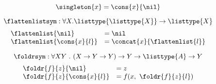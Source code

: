 \begin{definition}
  \[ \singleton{x} = \cons{x}{\nil} \]
\end{definition}

\begin{definition}
  \[ \flattenlistsym : \forall X . \listtype{\listtype{X}} \rightarrow \listtype{X} \]
  \[ \begin{array}{ll}
      \flattenlist{\nil} & = \nil \\
      \flattenlist{\cons{x}{l}} & = \concat{x}{\flattenlist{l}} \\
    \end{array} \]
\end{definition}

\begin{definition}
  \[ \foldrsym : \forall X Y ~.~ (X \rightarrow Y \rightarrow Y) \rightarrow Y \rightarrow \listtype{A} \rightarrow Y \]
  \[ \begin{array}{ll}
      \foldr{f}{z}{\nil} & = z \\
      \foldr{f}{z}{\cons{x}{l}} & = f(x,~ \foldr{f}{z}{l})
    \end{array}\]
\end{definition}

